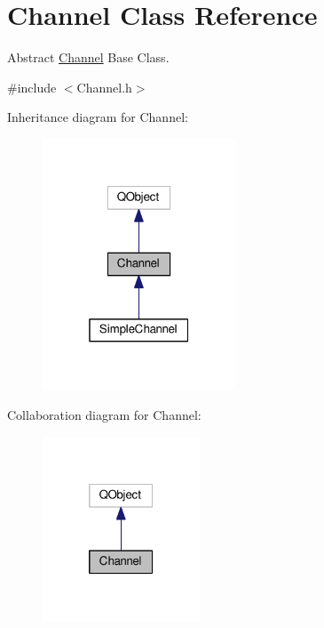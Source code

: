 \hypertarget{classChannel}{}\section{Channel Class Reference}
\label{classChannel}


Abstract \hyperlink{classChannel}{Channel} Base Class.  




{\ttfamily \#include $<$Channel.\+h$>$}



Inheritance diagram for Channel\+:\nopagebreak
\begin{figure}[H]
\begin{center}
\leavevmode
\includegraphics[width=163pt]{classChannel__inherit__graph}
\end{center}
\end{figure}


Collaboration diagram for Channel\+:\nopagebreak
\begin{figure}[H]
\begin{center}
\leavevmode
\includegraphics[width=133pt]{classChannel__coll__graph}
\end{center}
\end{figure}
